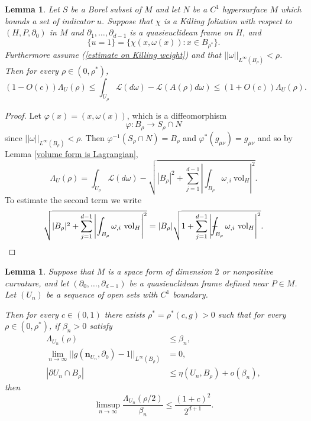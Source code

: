 \documentclass[reqno,12pt,letterpaper]{amsart}
\newcommand{\Lagrange}{\mathscr L}
\newcommand{\normal}{\mathbf n}
\newcommand{\vol}{\mathrm{vol}}
\newtheorem{lemma}[theorem]{Lemma}
\theoremstyle{definition}
\numberwithin{equation}{section}
\def\Xint#1{\mathchoice
{\XXint\displaystyle\textstyle{#1}}%
{\XXint\textstyle\scriptstyle{#1}}%
{\XXint\scriptstyle\scriptscriptstyle{#1}}%
{\XXint\scriptscriptstyle\scriptscriptstyle{#1}}%
\!\int}
\def\XXint#1#2#3{{\setbox0=\hbox{$#1{#2#3}{\int}$ }
\vcenter{\hbox{$#2#3$ }}\kern-.6\wd0}}
\def\dashint{\Xint-}
\begin{document}
\begin{lemma}
Let $S$ be a Borel subset of $M$ and let $N$ be a $C^1$ hypersurface $M$ which bounds a set of indicator $u$.
Suppose that $\chi$ is a Killing foliation with respect to $(H, P, \partial_0)$ in $M$ and $\partial_1, \dots, \partial_{d - 1}$ is a quasieuclidean frame on $H$, and
$$\{u = 1\} = \{\chi(x, \omega(x)): x \in B_{\rho^*}\}.$$
Furthermore assume (\ref{estimate on Killing weight}) and that $||\omega||_{L^\infty(B_\rho)} < \rho$.
Then for every $\rho \in (0, \rho^*)$,
$$(1 - O(c)) \Lambda_U(\rho) \leq \int_{U_\rho} \Lagrange(d\omega) - \Lagrange(A(\rho)d\omega) \leq (1 + O(c)) \Lambda_U(\rho).$$
\end{lemma}
\begin{proof}
Let $\varphi(x) = (x, \omega(x))$, which is a diffeomorphism
$$\varphi: B_\rho \to S_\rho \cap N$$
since $||\omega||_{L^\infty(B_\rho)} < \rho$.
Then $\varphi^{-1}(S_\rho \cap N) = B_\rho$ and $\varphi^*(g_{\mu\nu}) = g_{\mu\nu}$ and so by Lemma \ref{volume form is Lagrangian},
$$\Lambda_U(\rho) = \int_{U_\rho} \Lagrange(d\omega) - \sqrt{|B_\rho|^2 + \sum_{j=1}^{d - 1} \left|\int_{B_\rho} \omega_{,i} ~\vol_H\right|^2}.$$
To estimate the second term we write
$$\sqrt{|B_\rho|^2 + \sum_{j=1}^{d - 1} \left|\int_{B_\rho} \omega_{,i} ~\vol_H\right|^2} = |B_\rho| \sqrt{1 + \sum_{j=1}^{d - 1} \left|\dashint_{B_\rho} \omega_{,i} ~\vol_H\right|^2}.$$

\end{proof}

\begin{lemma}\label{DGLC1}
Suppose that $M$ is a space form of dimension $2$ or nonpositive curvature, and let $(\partial_0, \dots, \partial_{d - 1})$ be a quasieuclidean frame defined near $P \in M$.
Let $(U_n)$ be a sequence of open sets with $C^1$ boundary.

Then for every $c \in (0, 1)$ there exists $\rho^* = \rho^*(c, g) > 0$ such that for every $\rho \in (0, \rho^*)$, if $\beta_n > 0$ satisfy
\begin{align}
\Lambda_{U_n}(\rho) &\leq \beta_n, \label{DGLC1 small excess}\\
\lim_{n \to \infty} ||g(\normal_{U_n}, \partial_0) - 1||_{L^\infty(B_\rho)} &= 0, \label{DGLC1 up normals}\\
|\partial U_n \cap B_\rho| &\leq \eta(U_n, B_\rho) + o(\beta_n), \label{DGLC1 almost minimal}
\end{align}
then
$$\limsup_{n \to \infty} \frac{\Lambda_{U_n}(\rho/2)}{\beta_n} \leq \frac{(1 + c)^2}{2^{d + 1}}.$$
\end{lemma}
\end{document}
